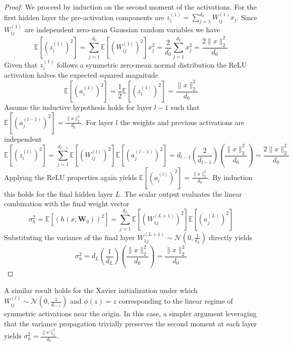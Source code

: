 \documentclass[letter,11pt]{article}
\begin{document}
\begin{proof}
We proceed by induction on the second moment of the activations. For the first hidden layer the pre-activation components are $z_i^{(1)} = \sum_{j=1}^{d_0} W_{ij}^{(1)} x_j$. Since $W_{ij}^{(1)}$ are independent zero-mean Gaussian random variables we have
\begin{equation}
\mathbb{E}\left[\left(z_i^{(1)}\right)^2\right] = \sum_{j=1}^{d_0} \mathbb{E}\left[\left(W_{ij}^{(1)}\right)^2\right] x_j^2 = \frac{2}{d_0} \sum_{j=1}^{d_0} x_j^2 = \frac{2\|x\|_2^2}{d_0}
\end{equation}
Given that $z_i^{(1)}$ follows a symmetric zero-mean normal distribution the ReLU activation halves the expected squared magnitude
\begin{equation}
\mathbb{E}\left[\left(a_i^{(1)}\right)^2\right] = \frac{1}{2}\mathbb{E}\left[\left(z_i^{(1)}\right)^2\right] = \frac{\|x\|_2^2}{d_0}
\end{equation}
Assume the inductive hypothesis holds for layer $l-1$ such that $\mathbb{E}\left[\left(a_j^{(l-1)}\right)^2\right] = \frac{\|x\|_2^2}{d_0}$. For layer $l$ the weights and previous activations are independent
\begin{equation}
\mathbb{E}\left[\left(z_i^{(l)}\right)^2\right] = \sum_{j=1}^{d_{l-1}} \mathbb{E}\left[\left(W_{ij}^{(l)}\right)^2\right] \mathbb{E}\left[\left(a_j^{(l-1)}\right)^2\right] = d_{l-1} \left(\frac{2}{d_{l-1}}\right) \left(\frac{\|x\|_2^2}{d_0}\right) = \frac{2\|x\|_2^2}{d_0}
\end{equation}
Applying the ReLU properties again yields $\mathbb{E}\left[\left(a_i^{(l)}\right)^2\right] = \frac{\|x\|_2^2}{d_0}$. By induction this holds for the final hidden layer $L$. The scalar output evaluates the linear combination with the final weight vector
\begin{equation}
\sigma_h^2 = \mathbb{E}\left[\left(h(x; \mathbf{W}_0)\right)^2\right] = \sum_{j=1}^{d_L} \mathbb{E}\left[\left(W_{1j}^{(L+1)}\right)^2\right] \mathbb{E}\left[\left(a_j^{(L)}\right)^2\right]
\end{equation}
Substituting the variance of the final layer $W_{1j}^{(L+1)} \sim \mathcal{N}\left(0, \frac{1}{d_L}\right)$ directly yields
\begin{equation}
\sigma_h^2 = d_L \left(\frac{1}{d_L}\right) \left(\frac{\|x\|_2^2}{d_0}\right) = \frac{\|x\|_2^2}{d_0}
\end{equation}
\end{proof}

A similar result holds for the Xavier initialization under which $W_{ij}^{(l)} \sim \mathcal{N}\left(0, \frac{1}{d_{l-1}}\right)$ and $\phi(z) = z$ corresponding to the linear regime of symmetric activations near the origin. In this case, a simpler argument leveraging that the variance propagation trivially preserves the second moment at each layer yields $\sigma_h^2 = \frac{\|x\|_2^2}{d_0}$.
\end{document}
